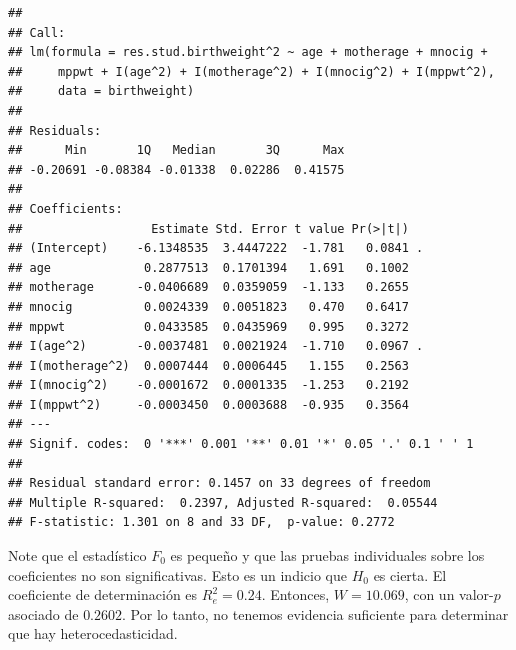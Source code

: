 \documentclass[
]{article}
\newenvironment{Shaded}{\begin{snugshade}}{\end{snugshade}}
\newcommand{\AttributeTok}[1]{\textcolor[rgb]{0.13,0.29,0.53}{#1}}
\newcommand{\DecValTok}[1]{\textcolor[rgb]{0.00,0.00,0.81}{#1}}
\newcommand{\FunctionTok}[1]{\textcolor[rgb]{0.13,0.29,0.53}{\textbf{#1}}}
\newcommand{\NormalTok}[1]{#1}
\newcommand{\OtherTok}[1]{\textcolor[rgb]{0.56,0.35,0.01}{#1}}
\newcommand{\SpecialCharTok}[1]{\textcolor[rgb]{0.81,0.36,0.00}{\textbf{#1}}}
\begin{document}
\begin{Shaded}
\end{Shaded}

\begin{verbatim}
## 
## Call:
## lm(formula = res.stud.birthweight^2 ~ age + motherage + mnocig + 
##     mppwt + I(age^2) + I(motherage^2) + I(mnocig^2) + I(mppwt^2), 
##     data = birthweight)
## 
## Residuals:
##      Min       1Q   Median       3Q      Max 
## -0.20691 -0.08384 -0.01338  0.02286  0.41575 
## 
## Coefficients:
##                  Estimate Std. Error t value Pr(>|t|)  
## (Intercept)    -6.1348535  3.4447222  -1.781   0.0841 .
## age             0.2877513  0.1701394   1.691   0.1002  
## motherage      -0.0406689  0.0359059  -1.133   0.2655  
## mnocig          0.0024339  0.0051823   0.470   0.6417  
## mppwt           0.0433585  0.0435969   0.995   0.3272  
## I(age^2)       -0.0037481  0.0021924  -1.710   0.0967 .
## I(motherage^2)  0.0007444  0.0006445   1.155   0.2563  
## I(mnocig^2)    -0.0001672  0.0001335  -1.253   0.2192  
## I(mppwt^2)     -0.0003450  0.0003688  -0.935   0.3564  
## ---
## Signif. codes:  0 '***' 0.001 '**' 0.01 '*' 0.05 '.' 0.1 ' ' 1
## 
## Residual standard error: 0.1457 on 33 degrees of freedom
## Multiple R-squared:  0.2397, Adjusted R-squared:  0.05544 
## F-statistic: 1.301 on 8 and 33 DF,  p-value: 0.2772
\end{verbatim}

Note que el estadístico \(F_{0}\) es pequeño y que las pruebas individuales sobre los coeficientes no son significativas. Esto es un indicio que \(H_{0}\) es cierta. El coeficiente de determinación es \(R_{e}^{2} = 0.24\). Entonces, \(W= 10.069\), con un valor-\(p\) asociado de \(0.2602\). Por lo tanto, no tenemos evidencia suficiente para determinar que hay heterocedasticidad.
\end{document}
